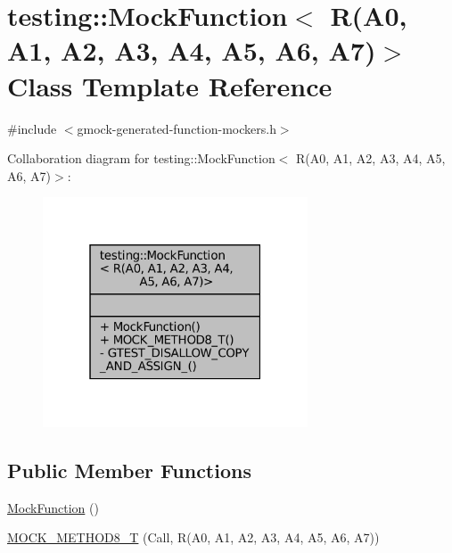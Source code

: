 \hypertarget{classtesting_1_1MockFunction_3_01R_07A0_00_01A1_00_01A2_00_01A3_00_01A4_00_01A5_00_01A6_00_01A7_08_4}{}\section{testing\+:\+:Mock\+Function$<$ R(A0, A1, A2, A3, A4, A5, A6, A7)$>$ Class Template Reference}
\label{classtesting_1_1MockFunction_3_01R_07A0_00_01A1_00_01A2_00_01A3_00_01A4_00_01A5_00_01A6_00_01A7_08_4}


{\ttfamily \#include $<$gmock-\/generated-\/function-\/mockers.\+h$>$}



Collaboration diagram for testing\+:\+:Mock\+Function$<$ R(A0, A1, A2, A3, A4, A5, A6, A7)$>$\+:
\nopagebreak
\begin{figure}[H]
\begin{center}
\leavevmode
\includegraphics[width=223pt]{classtesting_1_1MockFunction_3_01R_07A0_00_01A1_00_01A2_00_01A3_00_01A4_00_01A5_00_01A6_00_01A7_08_4__coll__graph}
\end{center}
\end{figure}
\subsection*{Public Member Functions}
\begin{DoxyCompactItemize}
\item 
\hyperlink{classtesting_1_1MockFunction_3_01R_07A0_00_01A1_00_01A2_00_01A3_00_01A4_00_01A5_00_01A6_00_01A7_08_4_ab2ac033046600396f088321ef0508e63}{Mock\+Function} ()
\item 
\hyperlink{classtesting_1_1MockFunction_3_01R_07A0_00_01A1_00_01A2_00_01A3_00_01A4_00_01A5_00_01A6_00_01A7_08_4_a895c470e00e07294ab42c09588ae1e4c}{M\+O\+C\+K\+\_\+\+M\+E\+T\+H\+O\+D8\+\_\+T} (Call, R(A0, A1, A2, A3, A4, A5, A6, A7))
\end{DoxyCompactItemize}
